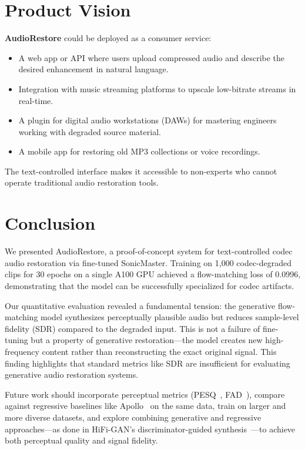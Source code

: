 \documentclass[conference]{IEEEtran}
\begin{document}
\section{Product Vision}

\textbf{AudioRestore} could be deployed as a consumer service:
\begin{itemize}
    \item A web app or API where users upload compressed audio and describe the
    desired enhancement in natural language.
    \item Integration with music streaming platforms to upscale low-bitrate
    streams in real-time.
    \item A plugin for digital audio workstations (DAWs) for mastering
    engineers working with degraded source material.
    \item A mobile app for restoring old MP3 collections or voice recordings.
\end{itemize}

The text-controlled interface makes it accessible to non-experts who cannot
operate traditional audio restoration tools.

\section{Conclusion}

We presented AudioRestore, a proof-of-concept system for text-controlled
codec audio restoration via fine-tuned SonicMaster. Training on 1{,}000
codec-degraded clips for 30 epochs on a single A100 GPU achieved a
flow-matching loss of 0.0996, demonstrating that the model can be
successfully specialized for codec artifacts.

Our quantitative evaluation revealed a fundamental tension: the generative
flow-matching model synthesizes perceptually plausible audio but reduces
sample-level fidelity (SDR) compared to the degraded input. This is not a
failure of fine-tuning but a property of generative restoration---the model
creates new high-frequency content rather than reconstructing the exact
original signal. This finding highlights that standard metrics like SDR are
insufficient for evaluating generative audio restoration systems.

Future work should incorporate perceptual metrics
(PESQ~\cite{rix2001pesq}, FAD~\cite{kilgour2019fad}), compare against
regressive baselines like Apollo~\cite{li2025apollo} on the same data, train
on larger and more diverse datasets, and explore combining generative and
regressive approaches---as done in HiFi-GAN's discriminator-guided
synthesis~\cite{kong2020hifigan}---to achieve both perceptual quality and
signal fidelity.

\newpage


\end{document}
